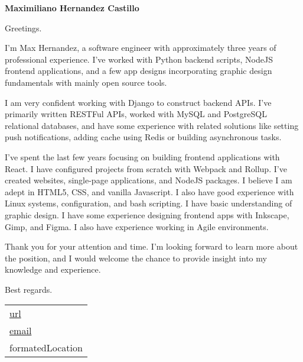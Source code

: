 \documentclass{article}
\begin{document}
\color{primary-950}

\textbf {
  \fontsize{26pt}{32pt}\selectfont
  \color{primary-950}Maximiliano
  \color{accent}Hernandez Castillo
}
\vspace{0.5cm}

Greetings.
\vspace{0.5cm}

I'm Max Hernandez, a software engineer with approximately three years of professional
experience. I've worked with Python backend scripts, NodeJS frontend applications, and a few
app designs incorporating graphic design fundamentals with mainly open source tools.


I am very confident working with Django to construct backend APIs. I've primarily written RESTFul
APIs, worked with MySQL and PostgreSQL relational databases, and have some experience with
related solutions like setting push notifications, adding cache using Redis or building
asynchronous tasks.


I've spent the last few years focusing on building frontend applications with React. I have
configured projects from scratch with Webpack and Rollup. I've created websites, single-page
applications, and NodeJS packages. I believe I am adept in HTML5, CSS, and vanilla Javascript.
I also have good experience with Linux systems, configuration, and bash scripting. I have basic
understanding of graphic design. I have some experience designing frontend apps with Inkscape,
Gimp, and Figma. I also have experience working in Agile environments.


Thank you for your attention and time. I'm looking forward to learn more about the position, and I
would welcome the chance to provide insight into my knowledge and experience.
\vspace{0.5cm}

Best regards.
\vspace{0.5cm}

{
  \setlength{\tabcolsep}{0pt}
  \begin{supertabular}{l}
    \href{ {{ url }} }{ {{ url }} } \\
    \href{ mailto:{{ email }} }{ {{ email }} } \\
     {{ formatedLocation }}
  \end{supertabular}
}
\end{document}
